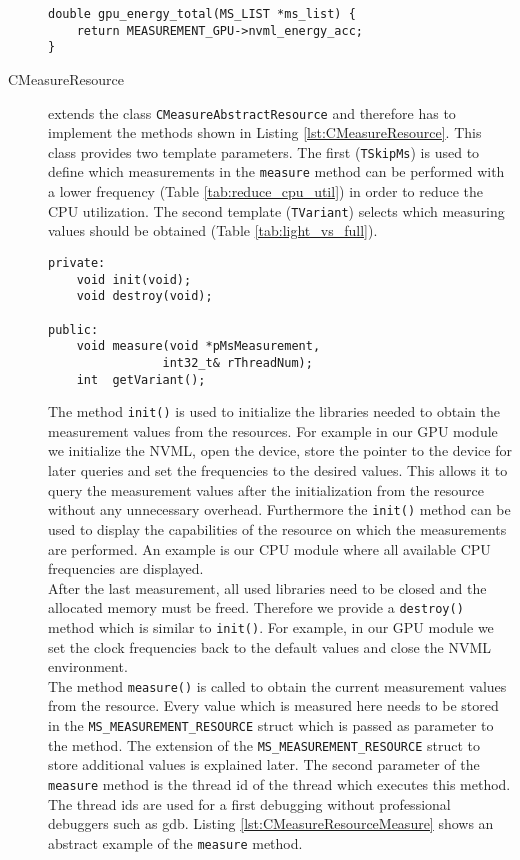\begin{description}
\begin{lstlisting}[caption={Example for a function to return values stored in a \texttt{MS\_MEASUREMENT\_RESOURCE} struct.}, label=lst:GPUEnergyExample]
double gpu_energy_total(MS_LIST *ms_list) {
	return MEASUREMENT_GPU->nvml_energy_acc;
}
	\end{lstlisting}
	
	\item[CMeasureResource] extends the class \texttt{CMeasureAbstractResource} and therefore has to implement the methods shown in Listing \ref{lst:CMeasureResource}. This class provides two template parameters. The first (\texttt{TSkipMs}) is used to define which measurements in the \texttt{measure} method can be performed with a lower frequency (Table \ref{tab:reduce_cpu_util}) in order to reduce the CPU utilization. The second template (\texttt{TVariant}) selects which measuring values should be obtained (Table \ref{tab:light_vs_full}).
	\begin{lstlisting}[caption={Methods of the \texttt{CMeasureResource} class that programmers have to implement in order to support a new resource.}, label=lst:CMeasureResource]
private:
	void init(void);
	void destroy(void);
	
public:
	void measure(void *pMsMeasurement, 
				int32_t& rThreadNum);
	int  getVariant();
	\end{lstlisting}
	
	The method \texttt{init()} is used to initialize the libraries needed to obtain the measurement values from the resources. For example in our GPU module we initialize the NVML, open the device, store the pointer to the device for later queries and set the frequencies to the desired values. This allows it to query the measurement values after the initialization from the resource without any unnecessary overhead. Furthermore the \texttt{init()} method can be used to display the capabilities of the resource on which the measurements are performed. An example is our CPU module where all available CPU frequencies are displayed.\\
	After the last measurement, all used libraries need to be closed and the allocated memory must be freed. Therefore we provide a \texttt{destroy()} method which is similar to \texttt{init()}. For example, in our GPU module we set the clock frequencies back to the default values and close the NVML environment.\\
	The method \texttt{measure()} is called to obtain the current measurement values from the resource. Every value which is measured here needs to be stored in the \texttt{MS\_MEASUREMENT\_RESOURCE} struct which is passed as parameter to the method. The extension of the \texttt{MS\_MEASUREMENT\_RESOURCE} struct to store additional values is explained later. The second parameter of the \texttt{measure} method is the thread id of the thread which executes this method. The thread ids are used for a first debugging without professional debuggers such as gdb. 
	Listing \ref{lst:CMeasureResourceMeasure} shows an abstract example of the \texttt{measure} method.
	

\end{description}
